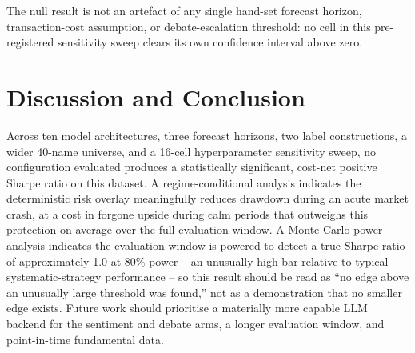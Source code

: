 \documentclass[10pt,conference]{IEEEtran}
\begin{document}
\begin{table}[htbp]
\centering
\caption{Hyperparameter sensitivity sweep (a ``+''-shaped design; see the pre-registration in this study's repository). No cell's interval excludes zero.}
\label{tab:hyperparam}
\end{table}

The null result is not an artefact of any single hand-set forecast horizon,
transaction-cost assumption, or debate-escalation threshold: no cell in this
pre-registered sensitivity sweep clears its own confidence interval above
zero.

\section{Discussion and Conclusion}
Across ten model architectures, three forecast horizons, two label
constructions, a wider 40-name universe, and a 16-cell hyperparameter
sensitivity sweep, no configuration evaluated produces a statistically
significant, cost-net positive Sharpe ratio on this dataset. A regime-conditional
analysis indicates the deterministic risk overlay meaningfully reduces
drawdown during an acute market crash, at a cost in forgone upside during calm
periods that outweighs this protection on average over the full evaluation
window. A Monte Carlo power analysis indicates the evaluation window is
powered to detect a true Sharpe ratio of approximately 1.0 at 80\% power --
an unusually high bar relative to typical systematic-strategy performance --
so this result should be read as ``no edge above an unusually large threshold
was found,'' not as a demonstration that no smaller edge exists. Future work
should prioritise a materially more capable LLM backend for the sentiment and
debate arms, a longer evaluation window, and point-in-time fundamental data.
\end{document}
